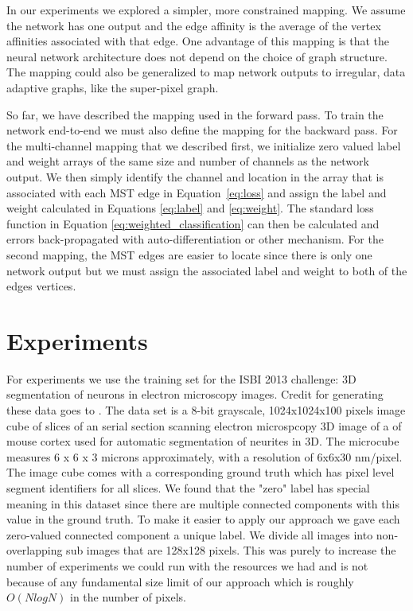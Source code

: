 \documentclass[letterpaper,twocolumn,fleqn]{article}
\begin{document}
In our experiments we explored a simpler, more constrained mapping. We assume the network has one output and the edge affinity is the average of the vertex affinities associated with that edge. One advantage of this mapping is that the neural network architecture does not depend on the choice of graph structure. The mapping could also be generalized to map network outputs to irregular, data adaptive graphs, like the super-pixel graph. 

So far, we have described the mapping used in the forward pass. To train the network end-to-end we must also define the mapping for the backward pass. For the multi-channel mapping that we described first, we initialize zero valued label and weight arrays of the same size and number of channels as the network output. We then simply identify the channel and location in the array that is associated with each MST edge in Equation~\ref{eq:loss} and assign the label and weight calculated in Equations \ref{eq:label} and \ref{eq:weight}. The standard loss function in Equation \ref{eq:weighted_classification} can then be calculated and errors back-propagated with auto-differentiation or other mechanism. For the second mapping, the MST edges are easier to locate since there is only one network output but we must assign the associated label and weight to both of the edges vertices. 

\section{Experiments}
 
For experiments we use the training set for the ISBI 2013 challenge: 3D segmentation of neurons in electron microscopy images. Credit for generating these data goes to \cite{kasthuri2015}. The data set is a 8-bit grayscale, 1024x1024x100 pixels image cube of slices of an serial section scanning electron microspcopy 3D image of a of mouse cortex used for automatic segmentation of neurites in 3D.  The microcube measures 6 x 6 x 3 microns approximately, with a resolution of 6x6x30 nm/pixel. The image cube comes with a corresponding ground truth which has pixel level segment identifiers for all slices. We found that the "zero" label has special meaning in this dataset since there are multiple connected components with this value in the ground truth. To make it easier to apply our approach we gave each zero-valued connected component a unique label. We divide all images into non-overlapping sub images that are 128x128 pixels. This was purely to increase the number of experiments we could run with the resources we had and is not because of any fundamental size limit of our approach which is roughly $O(NlogN)$ in the number of pixels. 
\end{document}
